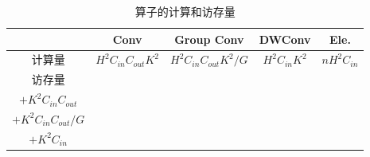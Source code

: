 \begin{table}
	\centering
	\caption{算子的计算和访存量}
	\label{tab:calculation}
	\fontsize{8}{8}
	\begin{tabular}{|c|c|c|c|c|}
		\hline
		& Conv & Group Conv & DWConv & Ele. \\
		\hline
		计算量 & $H^2C_{in}C_{out}K^2$ & $H^2C_{in}C_{out}K^2/G$ & $H^2C_{in}K^2$ & $nH^2C_{in}$ \\
		\hline
		访存量 & \makecell{$H^2C_{in}+H^2C_{out}$\\$+K^2C_{in}C_{out}$} & \makecell{$H^2C_{in}+H^2C_{out}$\\$+K^2C_{in}C_{out}/G$} & \makecell{$2H^2C_{in}$\\$+K^2C_{in}$} & \makecell{$H^2C_{in}$} \\
	    \hline
	\end{tabular}
\end{table}	